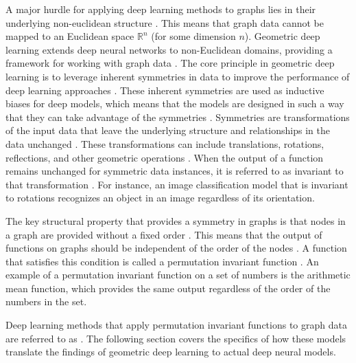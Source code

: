 A major hurdle for applying deep learning methods to graphs lies in their underlying non-euclidean structure \cite{wu_comprehensive_2021}. This means that graph data cannot be mapped to an Euclidean space $\mathbb{R}^n$ (for some dimension $n$). Geometric deep learning extends deep neural networks to non-Euclidean domains, providing a framework for working with graph data \cite{bronstein_geometric_2017, bronstein_geometric_2021}. The core principle in geometric deep learning is to leverage inherent symmetries in data to improve the performance of deep learning approaches \cite{bronstein_geometric_2021}. These inherent symmetries are used as inductive biases for deep models, which means that the models are designed in such a way that they can take advantage of the symmetries \cite{bronstein_geometric_2021}. Symmetries are transformations of the input data that leave the underlying structure and relationships in the data unchanged \cite{bronstein_geometric_2021}. These transformations can include translations, rotations, reflections, and other geometric operations \cite{bronstein_geometric_2021}. When the output of a function remains unchanged for symmetric data instances, it is referred to as invariant to that transformation \cite{bronstein_geometric_2017}. For instance, an image classification model that is invariant to rotations recognizes an object in an image regardless of its orientation. 



The key structural property that provides a symmetry in graphs is that nodes in a graph are provided without a fixed order \cite{bronstein_geometric_2021}. This means that the output of functions on graphs should be independent of the order of the nodes \cite{bronstein_geometric_2021}. A function that satisfies this condition is called a permutation invariant function \cite{bronstein_geometric_2021}. An example of a permutation invariant function on a set of numbers is the arithmetic mean function, which provides the same output regardless of the order of the numbers in the set.

Deep learning methods that apply permutation invariant functions to graph data are referred to as  \cite{bronstein_geometric_2021}. The following section covers the specifics of how these models translate the findings of geometric deep learning to actual deep neural models.





